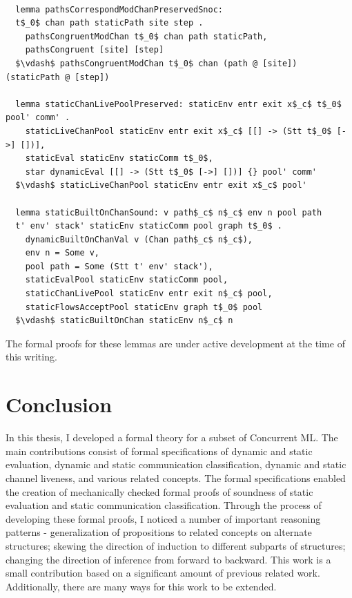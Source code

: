 \documentclass[letterpaper, 11pt]{report}
\begin{document}
\begin{lstlisting}[language=logic, mathescape]

  lemma pathsCorrespondModChanPreservedSnoc:
  t$_0$ chan path staticPath site step .
    pathsCongruentModChan t$_0$ chan path staticPath,
    pathsCongruent [site] [step]
  $\vdash$ pathsCongruentModChan t$_0$ chan (path @ [site]) (staticPath @ [step])

  lemma staticChanLivePoolPreserved: staticEnv entr exit x$_c$ t$_0$ pool' comm' . 
    staticLiveChanPool staticEnv entr exit x$_c$ [[] -> (Stt t$_0$ [->] [])],
    staticEval staticEnv staticComm t$_0$,
    star dynamicEval [[] -> (Stt t$_0$ [->] [])] {} pool' comm'
  $\vdash$ staticLiveChanPool staticEnv entr exit x$_c$ pool'

  lemma staticBuiltOnChanSound: v path$_c$ n$_c$ env n pool path
  t' env' stack' staticEnv staticComm pool graph t$_0$ . 
    dynamicBuiltOnChanVal v (Chan path$_c$ n$_c$),
    env n = Some v,
    pool path = Some (Stt t' env' stack'),
    staticEvalPool staticEnv staticComm pool,
    staticChanLivePool staticEnv entr exit n$_c$ pool,
    staticFlowsAcceptPool staticEnv graph t$_0$ pool
  $\vdash$ staticBuiltOnChan staticEnv n$_c$ n

\end{lstlisting}

The formal proofs for these lemmas are under active development at the time of this writing.

\chapter{Conclusion}
In this thesis, I developed a formal theory for a subset of Concurrent ML. The main contributions consist of formal specifications of dynamic and static evaluation, dynamic and static communication classification, dynamic and static channel liveness, and various related concepts.  The formal specifications enabled the creation of mechanically checked formal proofs of soundness of static evaluation and static communication classification.  Through the process of developing these formal proofs, I noticed a number of important reasoning patterns - generalization of propositions to related concepts on alternate structures; skewing the direction of induction to different subparts of structures; changing the direction of inference from forward to backward. This work is a small contribution based on a significant amount of previous related work.  Additionally, there are many ways for this work to be extended.
\end{document}
